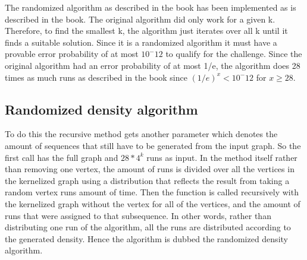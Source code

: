 The randomized algorithm as described in the book has been implemented as is described in the book. The original algorithm did only work for a given k. Therefore, to find the smallest k, the algorithm just iterates over all k until it finds a suitable solution. Since it is a randomized algorithm it must have a provable error probability of at most $10^-12$ to qualify for the challenge. Since the original algorithm had an error probability of at most 1/e, the algorithm does 28 times as much runs as described in the book since $(1/e)^x < 10^-12$ for $x \geq 28$.

\subsection{Randomized density algorithm}

To do this the recursive method gets another parameter which denotes the amount of sequences that still have to be generated from the input graph. So the first call has the full graph and $28 * 4^k$ runs as input. In the method itself rather than removing one vertex, the amount of runs is divided over all the vertices in the kernelized graph using a distribution that reflects the result from taking a random vertex runs amount of time. Then the function is called recursively with the kernelized graph without the vertex for all of the vertices, and the amount of runs that were assigned to that subsequence. In other words, rather than distributing one run of the algorithm, all the runs are distributed according to the generated density. Hence the algorithm is dubbed the randomized density algorithm.

